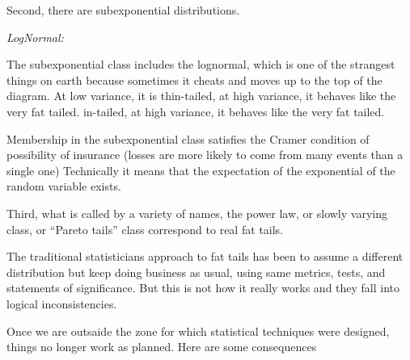 \documentclass[
]{book}
\begin{document}
Second, there are subexponential distributions.

\emph{LogNormal:}

The subexponential class includes the lognormal, which is one
of the strangest things on earth because sometimes it cheats
and moves up to the top of the diagram. At low variance, it is
thin-tailed, at high variance, it behaves like the very fat tailed.
in-tailed, at high variance, it behaves like the very fat tailed.

Membership in the subexponential class satisfies the Cramer
condition of possibility of insurance (losses are more likely to
come from many events than a single one)
Technically it means that the expectation of
the exponential of the random variable exists.

Third, what is called by a variety of names, the power law, or slowly
varying class, or ``Pareto tails'' class correspond to real fat tails.

The traditional statisticians approach to fat tails has been
to assume a different distribution but keep doing business as
usual, using same metrics, tests, and statements of significance.
But this is not how it really works and they fall into logical
inconsistencies.

Once we are outsaide the zone for which statistical techniques were designed,
things no longer work as planned.
Here are some consequences
\end{document}
